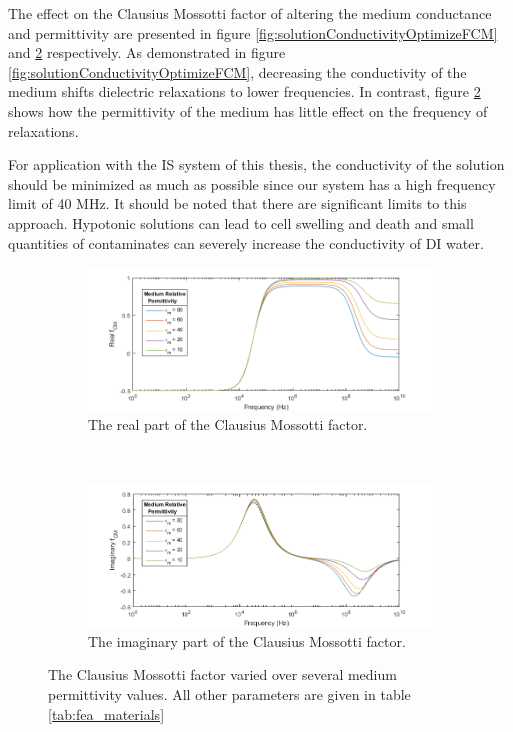 \par The effect on the Clausius Mossotti factor of altering the medium conductance and permittivity are presented in figure \ref{fig:solutionConductivityOptimizeFCM} and \ref{fig:solutionPermittivityOptimizeFCM} respectively. As demonstrated in figure \ref{fig:solutionConductivityOptimizeFCM}, decreasing the conductivity of the medium shifts dielectric relaxations to lower frequencies. In contrast, figure \ref{fig:solutionPermittivityOptimizeFCM} shows how the permittivity of the medium has little effect on the frequency of relaxations. 

\par For application with the IS system of this thesis, the conductivity of the solution should be minimized as much as possible since our system has a high frequency limit of 40 MHz. It should be noted that there are significant limits to this approach. Hypotonic solutions can lead to cell swelling and death and small quantities of contaminates can severely increase the conductivity of DI water. 

\begin{figure}[h]
    \centering
    \begin{subfigure}[b]{\textwidth}
        \centering
        \includegraphics[width=\textwidth]{images/realFCMvsPermittivity.png}
        \caption{The real part of the Clausius Mossotti factor.}
        \label{}
    \end{subfigure}
    \\
    \vspace{0.1 in}
    \begin{subfigure}[b]{\textwidth}
        \centering
        \includegraphics[width=\textwidth]{images/imaginaryFCMvsPermittivity.png}
        \caption{The imaginary part of the Clausius Mossotti factor.}
    \end{subfigure}
    \caption[The Clausius Mossotti factor varied over several medium permittivity values.]{The Clausius Mossotti factor varied over several medium permittivity values. All other parameters are given in table \ref{tab:fea_materials}}
    \label{fig:solutionPermittivityOptimizeFCM}
\end{figure}


